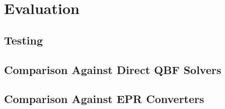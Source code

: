 \chapter{Evaluation}

\section{Testing}

\section{Comparison Against Direct QBF Solvers}

\section{Comparison Against EPR Converters}
